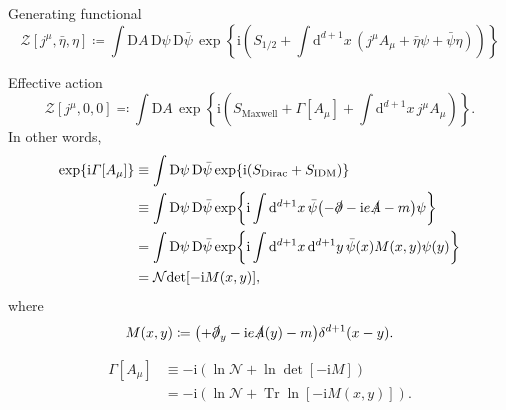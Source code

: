 \documentclass[12pt]{article}
\newcommand\mi{\mathrm{i}} %
\newcommand\dif{\mathrm{d}}
\newcommand\Dif{\mathrm{D}}
\DeclareMathOperator{\Tr}{Tr}
\newcommand{\rbr}[1]{{\left(#1\right)}}
\newcommand{\rfun}[2]{{#1}\mathopen{}\left(#2\right)\mathclose{}}
\newcommand{\sfun}[2]{{#1}\mathopen{}\left[#2\right]\mathclose{}}
\newcommand{\cfun}[2]{{#1}\mathopen{}\left\{#2\right\}\mathclose{}}
\begin{document}
Generating functional
\begin{equation}
\sfun{\mathcal{Z}}{j^\mu, \bar\eta, \eta} \coloneqq
\int\Dif A\,\Dif\psi\,\Dif\bar\psi\,\cfun{\exp}{\mi\rbr{S_{1/2}
+\int\dif^{d+1} x\,\rbr{j^\mu A_\mu + \bar\eta \psi+\bar\psi \eta}}}
\end{equation}

Effective action
\begin{equation}
\sfun{\mathcal{Z}}{j^\mu, 0, 0} \eqqcolon
\int\Dif A\,\cfun{\exp}{\mi\rbr{S_\text{Maxwell} + 
\sfun{\varGamma}{A_\mu}
+\int\dif^{d+1} x \,j^\mu A_\mu}}.
\end{equation}
In other words,
\begin{align}
\cfun{\exp}{\mi\sfun{\varGamma}{A_\mu}} &\equiv \int
\Dif\psi\,\Dif\bar\psi\,\cfun{\exp}{\mi\rbr{S_\text{Dirac}+S_\text{IDM}}}
\nonumber \\
&\equiv \int\Dif\psi\,\Dif\bar\psi\,\cfun{\exp}{\mi\int\dif^{d+1} x\,
\bar{\psi} \rbr{-\slashed{\partial}-\mi e \slashed{A} - m}\psi}
\nonumber \\
&= \int\Dif\psi\,\Dif\bar\psi\,\cfun{\exp}{\mi\int\dif^{d+1} x\,\dif^{d+1} y\,
\rfun{\bar\psi}{x} \rfun{M}{x, y} \rfun{\psi}{y}}
\nonumber \\
&= \mathcal{N}\sfun{\det}{-\mi \rfun{M}{x, y}},
\end{align}
where
\begin{equation}
\rfun{M}{x, y} \coloneqq \rbr{+\slashed{\partial}_y-\mi e 
\rfun{\slashed{A}}{y} - m}\rfun{\delta^{d+1}}{x-y}.
\end{equation}

\begin{align}
\sfun{\varGamma}{A_\mu} &\equiv
-\mi\rbr{\ln\mathcal{N} + \ln \sfun{\det}{-\mi M}} \nonumber \\
&= -\mi \rbr{\ln\mathcal{N} + \Tr \sfun{\ln}{-\mi \rfun{M}{x, y}}}.
\end{align}
\end{document}
